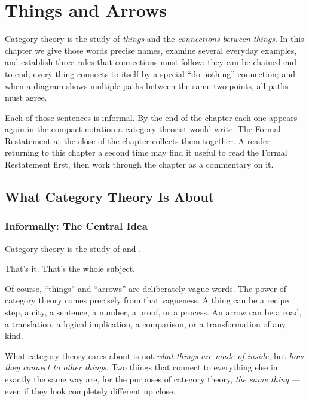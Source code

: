 \chapter{Things and Arrows}

\begin{overviewbox}
Category theory is the study of \emph{things} and the \emph{connections between
things}. In this chapter we give those words precise names, examine several
everyday examples, and establish three rules that connections must follow:
they can be chained end-to-end; every thing connects to itself by a special
``do nothing'' connection; and when a diagram shows multiple paths between the
same two points, all paths must agree.

Each of those sentences is informal. By the end of the chapter each one
appears again in the compact notation a category theorist would write. The
Formal Restatement at the close of the chapter collects them together. A
reader returning to this chapter a second time may find it useful to read the
Formal Restatement first, then work through the chapter as a commentary on it.
\end{overviewbox}

\section{What Category Theory Is About}

\subsection{Informally: The Central Idea}

Category theory is the study of  and .

That's it. That's the whole subject.

Of course, ``things'' and ``arrows'' are deliberately vague words. The power
of category theory comes precisely from that vagueness. A thing can be a
recipe step, a city, a sentence, a number, a proof, or a process. An arrow
can be a road, a translation, a logical implication, a comparison, or a
transformation of any kind.

What category theory cares about is not \emph{what things are made of inside},
but \emph{how they connect to other things}. Two things that connect to
everything else in exactly the same way are, for the purposes of category
theory, \emph{the same thing} --- even if they look completely different up
close.

